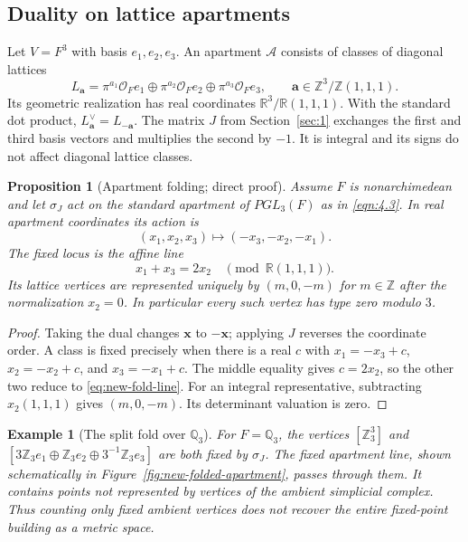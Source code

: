 \documentclass[12pt,letterpaper]{amsart}
\numberwithin{equation}{section}
\newtheorem{proposition}[theorem]{Proposition}
\newtheorem{example}[theorem]{Example}
\theoremstyle{definition}
\theoremstyle{plain}
\begin{document}
\subsection{Duality on lattice apartments}
Let $V=F^3$ with basis $e_1,e_2,e_3$. An apartment $\mathcal A$
consists of classes of diagonal lattices
\[
 L_{\boldsymbol a}=\pi^{a_1}\mathcal O_F e_1\oplus
 \pi^{a_2}\mathcal O_F e_2\oplus
 \pi^{a_3}\mathcal O_F e_3,\qquad
 \boldsymbol a\in\mathbb Z^3/\mathbb Z(1,1,1).
\]
Its geometric realization has real coordinates
$\mathbb R^3/\mathbb R(1,1,1)$. With the standard dot product,
$L_{\boldsymbol a}^{\vee}=L_{-\boldsymbol a}$. The matrix $J$ from
Section~\ref{sec:1} exchanges the first and third basis vectors and
multiplies the second by $-1$. It is integral and its signs do not
affect diagonal lattice classes.

\begin{proposition}[Apartment folding; direct proof]
\label{prop:new-fold}
Assume $F$ is nonarchimedean and let $\sigma_J$ act on the standard
apartment of $PGL_3(F)$ as in \eqref{eqn:4.3}. In real apartment
coordinates its action is
\[
 (x_1,x_2,x_3)\longmapsto(-x_3,-x_2,-x_1).
\]
The fixed locus is the affine line
\begin{equation}\label{eq:new-fold-line}
 x_1+x_3=2x_2\quad \pmod{\mathbb R(1,1,1)}.
\end{equation}
Its lattice vertices are represented uniquely by
$(m,0,-m)$ for $m\in\mathbb Z$ after the normalization $x_2=0$.
In particular every such vertex has type zero modulo $3$.
\end{proposition}
\begin{proof}
Taking the dual changes $\boldsymbol x$ to $-\boldsymbol x$;
applying $J$ reverses the coordinate order. A class is fixed precisely
when there is a real $c$ with
$x_1=-x_3+c$, $x_2=-x_2+c$, and $x_3=-x_1+c$.
The middle equality gives $c=2x_2$, so the other two reduce to
\eqref{eq:new-fold-line}. For an integral representative, subtracting
$x_2(1,1,1)$ gives $(m,0,-m)$. Its determinant valuation is zero.
\end{proof}

\begin{example}[The split fold over $\mathbb Q_3$]
\label{ex:new-fold3}
For $F=\mathbb Q_3$, the vertices $[\mathbb Z_3^3]$ and
$[3\mathbb Z_3 e_1\oplus\mathbb Z_3e_2\oplus
3^{-1}\mathbb Z_3e_3]$ are both fixed by $\sigma_J$.
The fixed apartment line, shown schematically in Figure~\ref{fig:new-folded-apartment}, passes through them. It contains points not
represented by vertices of the ambient simplicial complex. Thus
counting only fixed ambient vertices does not recover the entire
fixed-point building as a metric space.
\end{example}
\end{document}
